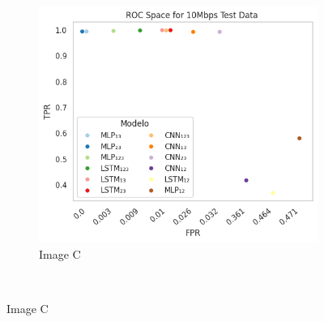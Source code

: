 \documentclass[a4paper,fleqn]{cas-sc}
\begin{document}
\begin{figure}
\begin{minipage}[t]{0.46\textwidth}
			\begin{subfigure}[t]{0.33\textwidth}
				\includegraphics[draft=false, width=\textwidth]{./figs/ROC-Space-Test-Data-10Mbps.png} 
				\caption{Image C}
				\label{fig:1c}
			\end{subfigure}%
			~
			

\end{minipage}
\end{figure}
\end{document}
